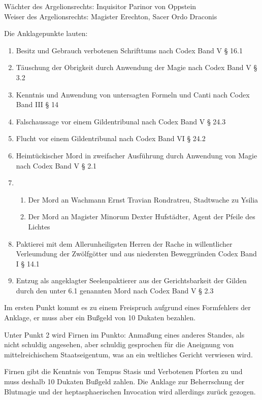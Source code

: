 Wächter des Argelionsrechts: Inquisitor Parinor von Oppstein\\
Weiser des Argelionsrechts: Magister Erechton, Sacer Ordo Draconis

Die Anklagepunkte lauten:

\begin{enumerate}
\item Besitz und Gebrauch verbotenen Schrifttums nach Codex Band V § 16.1
\item Täuschung der Obrigkeit durch Anwendung der Magie nach Codex Band V § 3.2
\item Kenntnis und Anwendung von untersagten Formeln und Canti nach Codex Band III § 14
\item Falschaussage vor einem Gildentribunal nach Codex Band V § 24.3
\item Flucht vor einem Gildentribunal nach Codex Band VI § 24.2
\item Heimtückischer Mord in zweifacher Ausführung durch Anwendung von Magie nach Codex Band V § 2.1
\item \begin{enumerate}
\item Der Mord an Wachmann Ernst Travian Rondratreu, Stadtwache zu Ysilia
\item Der Mord an Magister Minorum Dexter Hufstädter, Agent der Pfeile des Lichtes
\end{enumerate}
\item Paktierei mit dem Allerunheiligsten Herren der Rache in willentlicher Verleumdung der Zwölfgötter und aus niedersten Beweggründen Codex Band I § 14.1
\item Entzug als angeklagter Seelenpaktierer aus der Gerichtsbarkeit der Gilden durch den unter 6.1 genannten Mord nach Codex Band V § 2.3
\end{enumerate}


Im ersten Punkt kommt es zu einem Freispruch aufgrund eines Formfehlers der Anklage, er muss aber ein Bußgeld von 10 Dukaten bezahlen.

Unter Punkt 2 wird Firnen im Punkto: Anmaßung eines anderes Standes, als nicht schuldig angesehen, aber schuldig gesprochen für die Aneignung von mittelreichischem Staatseigentum, was an ein weltliches Gericht verwiesen wird.

Firnen gibt die Kenntnis von Tempus Stasis und Verbotenen Pforten zu und muss deshalb 10 Dukaten Bußgeld zahlen. Die Anklage zur Beherrschung der Blutmagie und der heptasphaerischen Invocation wird allerdings zurück gezogen.

